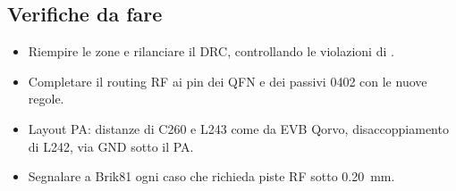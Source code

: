 \subsection{Verifiche da fare}
\begin{itemize}
  \item Riempire le zone e rilanciare il DRC, controllando le violazioni di .
  \item Completare il routing RF ai pin dei QFN e dei passivi 0402 con le nuove regole.
  \item Layout PA: distanze di C260 e L243 come da EVB Qorvo, disaccoppiamento di L242, via GND sotto il PA.
  \item Segnalare a Brik81 ogni caso che richieda piste RF sotto \SI{0,20}{\milli\metre}.
\end{itemize}
